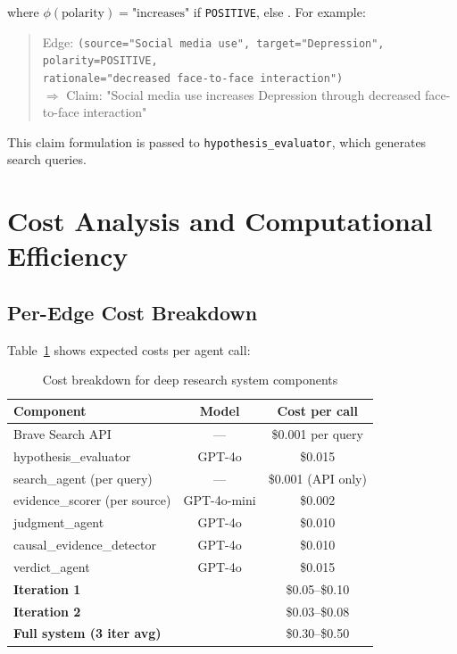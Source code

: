 where $\phi(\text{polarity}) = \text{"increases"}$ if \texttt{POSITIVE}, else . For example:

\begin{quote}
Edge: \texttt{(source="Social media use", target="Depression", polarity=POSITIVE, \\
rationale="decreased face-to-face interaction")} \\
$\Rightarrow$ Claim: "Social media use increases Depression through decreased face-to-face interaction"
\end{quote}

This claim formulation is passed to \texttt{hypothesis\_evaluator}, which generates search queries.

\section{Cost Analysis and Computational Efficiency}

\subsection{Per-Edge Cost Breakdown}

Table~\ref{tab:cost_breakdown} shows expected costs per agent call:

\begin{table}[h]
\centering
\caption{Cost breakdown for deep research system components}
\label{tab:cost_breakdown}
\begin{tabular}{lcc}
\toprule
\textbf{Component} & \textbf{Model} & \textbf{Cost per call} \\
\midrule
Brave Search API & --- & \$0.001 per query \\
hypothesis\_evaluator & GPT-4o & \$0.015 \\
search\_agent (per query) & --- & \$0.001 (API only) \\
evidence\_scorer (per source) & GPT-4o-mini & \$0.002 \\
judgment\_agent & GPT-4o & \$0.010 \\
causal\_evidence\_detector & GPT-4o & \$0.010 \\
verdict\_agent & GPT-4o & \$0.015 \\
\midrule
\textbf{Iteration 1} & & \$0.05--\$0.10 \\
\textbf{Iteration 2} & & \$0.03--\$0.08 \\
\textbf{Full system (3 iter avg)} & & \$0.30--\$0.50 \\
\bottomrule
\end{tabular}
\end{table}

